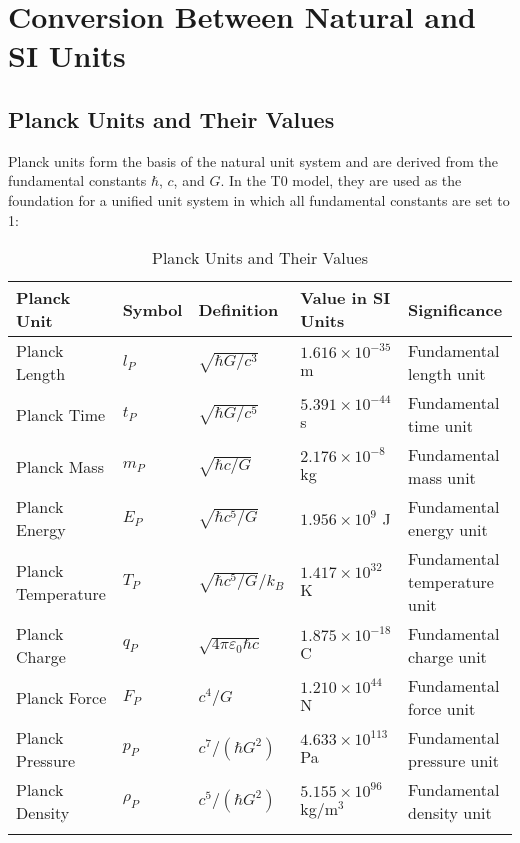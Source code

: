 \documentclass[12pt,a4paper]{article}
\begin{document}
	\section{Conversion Between Natural and SI Units}
	
	\subsection{Planck Units and Their Values}
	
	Planck units form the basis of the natural unit system and are derived from the fundamental constants $\hbar$, $c$, and $G$. In the T0 model, they are used as the foundation for a unified unit system in which all fundamental constants are set to 1:
	
	\begin{table}[ht]
		\centering
		\begin{adjustbox}{scale=0.75}
			\begin{tabular}{lllll}
				\hline
				\textbf{Planck Unit} & \textbf{Symbol} & \textbf{Definition} & \textbf{Value in SI Units} & \textbf{Significance} \\
				\hline
				Planck Length & $l_P$ & $\sqrt{\hbar G/c^3}$ & $1.616 \times 10^{-35}$ m & Fundamental length unit \\
				Planck Time & $t_P$ & $\sqrt{\hbar G/c^5}$ & $5.391 \times 10^{-44}$ s & Fundamental time unit \\
				Planck Mass & $m_P$ & $\sqrt{\hbar c/G}$ & $2.176 \times 10^{-8}$ kg & Fundamental mass unit \\
				Planck Energy & $E_P$ & $\sqrt{\hbar c^5/G}$ & $1.956 \times 10^9$ J & Fundamental energy unit \\
				Planck Temperature & $T_P$ & $\sqrt{\hbar c^5/G}/k_B$ & $1.417 \times 10^{32}$ K & Fundamental temperature unit \\
				Planck Charge & $q_P$ & $\sqrt{4\pi\varepsilon_0\hbar c}$ & $1.875 \times 10^{-18}$ C & Fundamental charge unit \\
				Planck Force & $F_P$ & $c^4/G$ & $1.210 \times 10^{44}$ N & Fundamental force unit \\
				Planck Pressure & $p_P$ & $c^7/(\hbar G^2)$ & $4.633 \times 10^{113}$ Pa & Fundamental pressure unit \\
				Planck Density & $\rho_P$ & $c^5/(\hbar G^2)$ & $5.155 \times 10^{96}$ kg/m$^3$ & Fundamental density unit \\
				\hline
				\multicolumn{4}{c}{} \\
				\hline
			\end{tabular}
		\end{adjustbox}
		\caption{Planck Units and Their Values}
		\label{tab:planck_units}
	\end{table}
	
\end{document}
